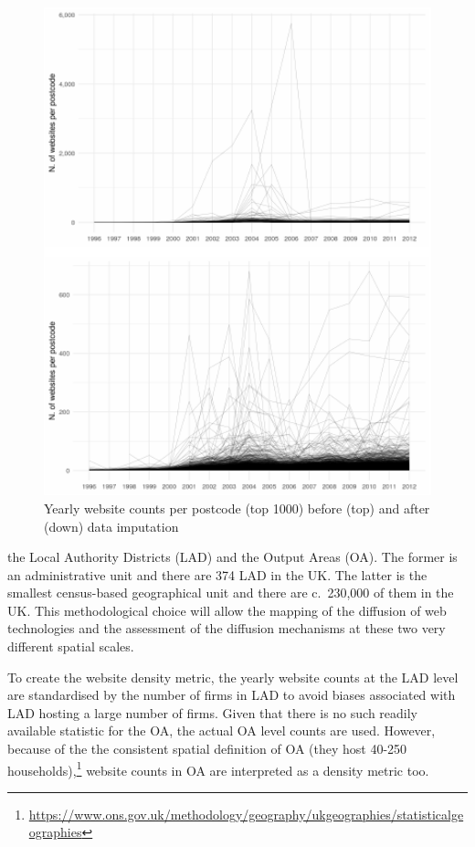 \documentclass[
  authoryear,
  preprint,
  3p]{elsarticle}
\begin{document}
\begin{figure}[H]

{\centering \includegraphics[width=1\textwidth,height=0.7\textheight]{tranos2025_files/figure-pdf/unnamed-chunk-2-1.pdf}

}

\caption{\label{correct}Yearly website counts per postcode (top 1000)
before (top) and after (down) data imputation}

\end{figure}%

the Local Authority Districts (LAD) and the Output Areas (OA). The
former is an administrative unit and there are 374 LAD in the UK. The
latter is the smallest census-based geographical unit and there are
c.~230,000 of them in the UK. This methodological choice will allow the
mapping of the diffusion of web technologies and the assessment of the
diffusion mechanisms at these two very different spatial scales.

To create the website density metric, the yearly website counts at the
LAD level are standardised by the number of firms in LAD to avoid biases
associated with LAD hosting a large number of firms. Given that there is
no such readily available statistic for the OA, the actual OA level
counts are used. However, because of the the consistent spatial
definition of OA (they host 40-250 households),\footnote{\url{https://www.ons.gov.uk/methodology/geography/ukgeographies/statisticalgeographies}}
website counts in OA are interpreted as a density metric too.
\end{document}
